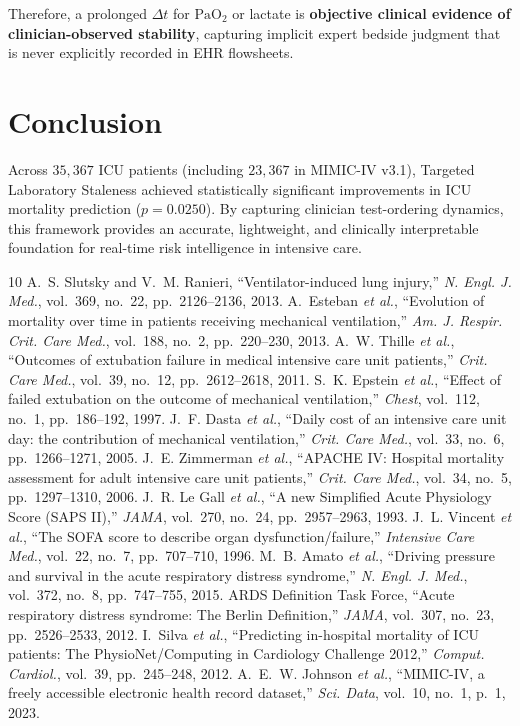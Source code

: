 \documentclass[journal]{IEEEtran}
\begin{document}
Therefore, a prolonged $\Delta t$ for $\text{PaO}_2$ or lactate is \textbf{objective clinical evidence of clinician-observed stability}, capturing implicit expert bedside judgment that is never explicitly recorded in EHR flowsheets.

\section{Conclusion}
Across $35,367$ ICU patients (including $23,367$ in MIMIC-IV v3.1), Targeted Laboratory Staleness achieved statistically significant improvements in ICU mortality prediction ($p = 0.0250$). By capturing clinician test-ordering dynamics, this framework provides an accurate, lightweight, and clinically interpretable foundation for real-time risk intelligence in intensive care.

\begin{thebibliography}{10}
 A.~S. Slutsky and V.~M. Ranieri, ``Ventilator-induced lung injury,'' \textit{N. Engl. J. Med.}, vol.~369, no.~22, pp.~2126--2136, 2013.
 A.~Esteban \textit{et al.}, ``Evolution of mortality over time in patients receiving mechanical ventilation,'' \textit{Am. J. Respir. Crit. Care Med.}, vol.~188, no.~2, pp.~220--230, 2013.
 A.~W. Thille \textit{et al.}, ``Outcomes of extubation failure in medical intensive care unit patients,'' \textit{Crit. Care Med.}, vol.~39, no.~12, pp.~2612--2618, 2011.
 S.~K. Epstein \textit{et al.}, ``Effect of failed extubation on the outcome of mechanical ventilation,'' \textit{Chest}, vol.~112, no.~1, pp.~186--192, 1997.
 J.~F. Dasta \textit{et al.}, ``Daily cost of an intensive care unit day: the contribution of mechanical ventilation,'' \textit{Crit. Care Med.}, vol.~33, no.~6, pp.~1266--1271, 2005.
 J.~E. Zimmerman \textit{et al.}, ``APACHE IV: Hospital mortality assessment for adult intensive care unit patients,'' \textit{Crit. Care Med.}, vol.~34, no.~5, pp.~1297--1310, 2006.
 J.~R. Le Gall \textit{et al.}, ``A new Simplified Acute Physiology Score (SAPS II),'' \textit{JAMA}, vol.~270, no.~24, pp.~2957--2963, 1993.
 J.~L. Vincent \textit{et al.}, ``The SOFA score to describe organ dysfunction/failure,'' \textit{Intensive Care Med.}, vol.~22, no.~7, pp.~707--710, 1996.
 M.~B. Amato \textit{et al.}, ``Driving pressure and survival in the acute respiratory distress syndrome,'' \textit{N. Engl. J. Med.}, vol.~372, no.~8, pp.~747--755, 2015.
 ARDS Definition Task Force, ``Acute respiratory distress syndrome: The Berlin Definition,'' \textit{JAMA}, vol.~307, no.~23, pp.~2526--2533, 2012.
 I.~Silva \textit{et al.}, ``Predicting in-hospital mortality of ICU patients: The PhysioNet/Computing in Cardiology Challenge 2012,'' \textit{Comput. Cardiol.}, vol.~39, pp.~245--248, 2012.
 A.~E.~W. Johnson \textit{et al.}, ``MIMIC-IV, a freely accessible electronic health record dataset,'' \textit{Sci. Data}, vol.~10, no.~1, p.~1, 2023.
\end{thebibliography}
\end{document}
